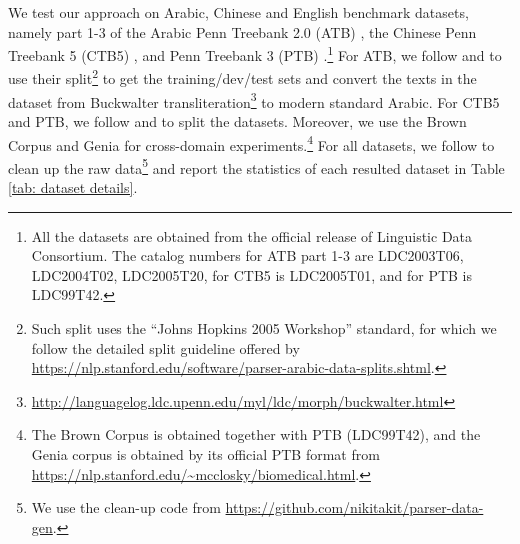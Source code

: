 \documentclass[11pt,a4paper]{article}
\begin{document}
We test our approach on Arabic, Chinese and English benchmark datasets, namely part 1-3 of the Arabic Penn Treebank 2.0 (ATB) \cite{maamouri2004penn}, the Chinese Penn Treebank 5 (CTB5) \cite{xue2005penn}, and 
Penn Treebank 3 (PTB) \cite{marcus-etal-1993-building}.\footnote{All the datasets are obtained from the official release of Linguistic Data Consortium. The catalog numbers for ATB part 1-3 are LDC2003T06, LDC2004T02, LDC2005T20, for CTB5 is LDC2005T01, and for PTB is LDC99T42.}
For ATB, we follow  and  to use their split\footnote{Such split uses the ``Johns Hopkins 2005 Workshop'' standard, for which we follow the detailed split guideline offered by \url{https://nlp.stanford.edu/software/parser-arabic-data-splits.shtml}.} to get the training/dev/test sets and convert the texts in the dataset from Buckwalter transliteration\footnote{\url{http://languagelog.ldc.upenn.edu/myl/ldc/morph/buckwalter.html}} to modern standard Arabic.
For CTB5 and PTB, we follow  and  to split the datasets.
Moreover, we use the Brown Corpus \cite{marcus-etal-1993-building} and Genia \cite{tateisi-etal-2005-syntax} for cross-domain experiments.\footnote{The Brown Corpus is obtained together with PTB (LDC99T42), and the Genia corpus is obtained by its official PTB format from \url{https://nlp.stanford.edu/~mcclosky/biomedical.html}.}
For all datasets, we follow  to clean up the raw data\footnote{We use the clean-up code from \url{https://github.com/nikitakit/parser-data-gen}.} and report the statistics of each resulted dataset in Table \ref{tab: dataset details}.
\end{document}
